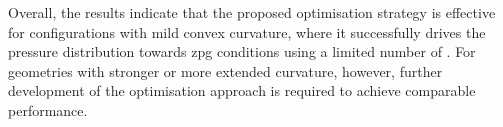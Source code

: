 Overall, the results indicate that the proposed optimisation strategy is effective for configurations with mild convex curvature, where it successfully drives the pressure distribution towards \acrshort{zpg} conditions using a limited number of . For geometries with stronger or more extended curvature, however, further development of the optimisation approach is required to achieve comparable performance.


